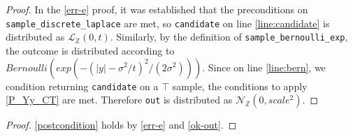 \documentclass{article}
\begin{document}
\begin{proof} 
    In the \ref{err-e} proof, it was established that the preconditions on \texttt{sample\_discrete\_laplace} are met,  
    so \texttt{candidate} on line \ref{line:candidate} is distributed as $\mathcal{L}_\mathbb{Z}(0, t)$. 
    Similarly, by the definition of \texttt{sample\_bernoulli\_exp}, the outcome is distributed according to $Bernoulli(exp(-(|y| - \sigma^2 / t)^2 / (2 \sigma^2)))$. 
    Since on line \ref{line:bern}, we condition returning \texttt{candidate} on a $\top$ sample,  
    the conditions to apply \ref{P_Yy_CT} are met.  
    Therefore \texttt{out} is distributed as $\mathcal{N}_\mathbb{Z}(0, scale^2)$. 
\end{proof} 
 
\begin{proof} 
    \ref{postcondition} holds by \ref{err-e} and \ref{ok-out}. 
\end{proof} 
 
 
 
 
\end{document}
